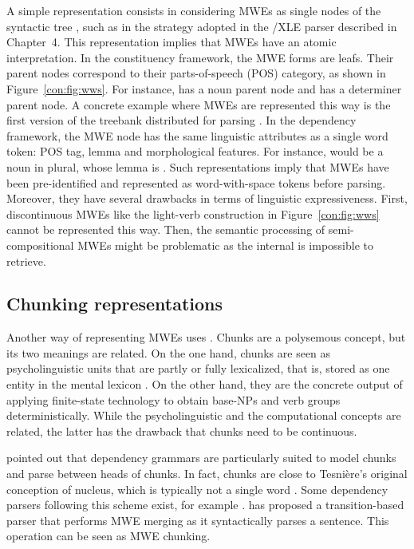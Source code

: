 \documentclass[output=paper]{langsci/langscibook}
\begin{document}
A simple representation consists in considering MWEs as single nodes of the syntactic tree \citep{sag02}, such as in the strategy adopted in the /XLE parser described in Chapter~4. This  representation implies that MWEs have an atomic interpretation. In the constituency framework, the MWE forms are leafs. Their parent nodes correspond to their parts-of-speech (POS) category, as shown in Figure~\ref{con:fig:wws}. For instance,  has a noun parent node and  has a determiner parent node. 
A concrete example where MWEs are represented this way is the first version of the  treebank distributed for parsing \citep{candito:2009}. 
In the dependency framework, the MWE node has the same linguistic attributes as a single word token: POS tag, lemma and morphological features. For instance,  would be a noun in plural, whose lemma is . Such representations imply that MWEs have been pre-identified and represented as word-with-space tokens before parsing. Moreover, they have several drawbacks in terms of linguistic expressiveness. First, discontinuous MWEs like the light-verb construction  in Figure~\ref{con:fig:wws} cannot be represented this way. Then, the semantic processing of semi-compositional MWEs might be problematic as the internal  is impossible to retrieve.%

\subsection {Chunking representations}
\label{con:ssec:chunking}

Another way of representing MWEs uses . 
Chunks are a polysemous concept, but its two meanings are related. 
On the one hand, chunks are seen as psycholinguistic units that are partly or fully lexicalized, that is, stored as one entity in the mental lexicon \citep{miller56,pawley-syder83,tomasello98,wray08}. 
On the other hand, they are 
the concrete output of applying finite-state technology to obtain base-NPs and verb groups deterministically. While the psycholinguistic and the computational concepts are related, the latter has the drawback that chunks need to be continuous.

\citet{abney1991procedure} pointed out that dependency grammars are particularly suited to model chunks and parse between heads of chunks. 
In fact, chunks are close to Tesnière's original conception of nucleus, which is typically not a single word \citep{tesniere:1959}. Some dependency parsers following this scheme exist, for example \citet{schneiderphd}. \citet{nivre:2014} has proposed a transition-based parser that performs MWE merging as it syntactically parses a sentence. This operation can be seen as MWE chunking. 
\end{document}
